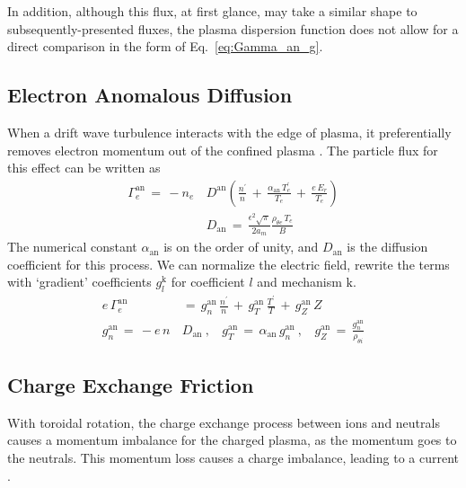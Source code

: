 In addition, although this flux, at first glance, may take a similar shape to subsequently-presented fluxes, the plasma dispersion function does not allow for a direct comparison in the form of Eq.~\ref{eq:Gamma_an_g}.


\subsection{Electron Anomalous Diffusion}\label{ssec:an_diffusion}
When a drift wave turbulence interacts with the edge of plasma, it preferentially removes electron momentum out of the confined plasma \cite{itoh_model_1988} \cite{stringer_non-ambipolar_1995}.
The particle flux for this effect can be written as
\begin{align} %
	\Gamma_e^\text{an} \,=\, -n_e \, &D^\text{an} \left(\frac{n^\prime}{n} \,+\,
		\frac{\alpha_\text{an}\,T_e^\prime}{T_e} \,+\, \frac{e\,E_r}{T_e}\right)
		\label{eq:Gamma_an_orig} \\
	&D_\text{an} \,=\, \frac{\epsilon^2 \sqrt{\pi}}{2 a_m}
		\frac{\rho_{\theta e} \, T_e}{B} \label{eq:D_an}
\end{align}
The numerical constant $\alpha_\text{an}$ is on the order of unity, and $D_\text{an}$ is the diffusion coefficient for this process.
We can normalize the electric field, rewrite the terms with `gradient' coefficients $g_l^\text{k}$ for coefficient $l$ and mechanism $\text{k}$.
\begin{align} %
	e\,\Gamma_e^\text{an} \,&=\, g_n^\text{an}\,\frac{n^\prime}{n} \,+\,
		g_T^\text{an}\,\frac{T^\prime}{T} \,+\,
		g_Z^\text{an}\,Z \label{eq:Gamma_an_g} \\
	g_n^\text{an} \,=\, -e \, n \, &D_\text{an}~,~~~~
		g_T^\text{an} \,=\, \alpha_\text{an} \, g_n^\text{an}~,~~~~
		g_Z^\text{an} \,=\, \frac{g_n^\text{an}}{\rho_{\theta i}}
		\label{eq:g_an}
\end{align}


\subsection{Charge Exchange Friction}\label{ssec:cx_friction}
With toroidal rotation, the charge exchange process between ions and neutrals causes a momentum imbalance for the charged plasma, as the momentum goes to the neutrals.
This momentum loss causes a charge imbalance, leading to a current \cite{toda_theoretical_1997}.

